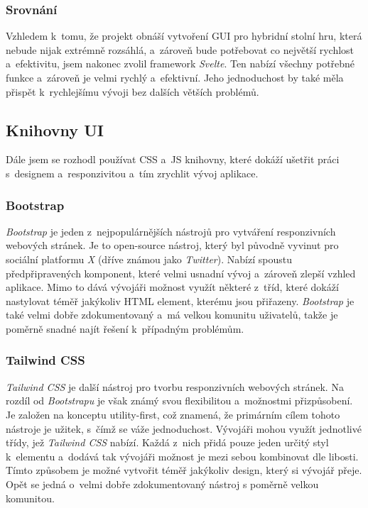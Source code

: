 \subsubsection*{Srovnání}
Vzhledem k~tomu, že projekt obnáší vytvoření GUI pro hybridní stolní hru, která nebude nijak extrémně rozsáhlá, a~zároveň bude potřebovat co největší rychlost a~efektivitu, jsem nakonec zvolil framework \textit{Svelte}. Ten nabízí všechny potřebné funkce a~zároveň je velmi rychlý a~efektivní. Jeho jednoduchost by také měla přispět k~rychlejšímu vývoji bez dalších větších problémů.

\pagebreak
\subsection{Knihovny UI}
Dále jsem se rozhodl používat CSS a~JS knihovny, které dokáží ušetřit práci s~designem a~responzivitou a~tím zrychlit vývoj aplikace.

\subsubsection*{Bootstrap}
\textit{Bootstrap} je jeden z~nejpopulárnějších nástrojů pro vytváření responzivních webových stránek. Je to open-source nástroj, který byl původně vyvinut pro sociální platformu \textit{X} (dříve známou jako \textit{Twitter}). Nabízí spoustu předpřipravených komponent, které velmi usnadní vývoj a~zároveň zlepší vzhled aplikace. Mimo to dává vývojáři možnost využít některé z~tříd, které dokáží nastylovat téměř jakýkoliv HTML element, kterému jsou přiřazeny. \textit{Bootstrap} je také velmi dobře zdokumentovaný a~má velkou komunitu uživatelů, takže je poměrně snadné najít řešení k~případným problémům. \cite{bootstrap,what_is_bootstrap}

\subsubsection*{Tailwind CSS}
\textit{Tailwind CSS} je další nástroj pro tvorbu responzivních webových stránek. Na rozdíl od \textit{Bootstrapu} je však známý svou flexibilitou a~možnostmi přizpůsobení. Je založen na konceptu utility-first, což znamená, že primárním cílem tohoto nástroje je užitek, s~čímž se váže jednoduchost. Vývojáři mohou využít jednotlivé třídy, jež \textit{Tailwind CSS} nabízí. Každá z~nich přidá pouze jeden určitý styl k~elementu a~dodává tak vývojáři možnost je mezi sebou kombinovat dle libosti. Tímto způsobem je možné vytvořit téměř jakýkoliv design, který si vývojář přeje. Opět se jedná o~velmi dobře zdokumentovaný nástroj s poměrně velkou komunitou. \cite{tailwind_css}

